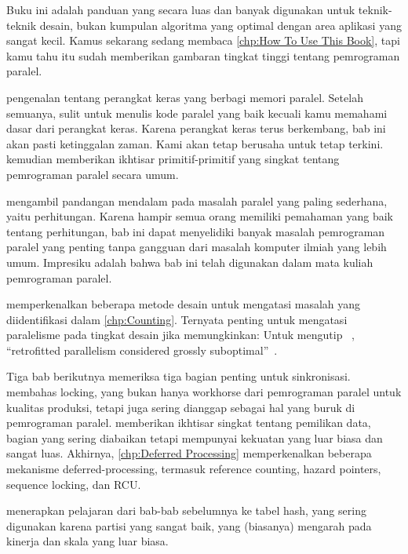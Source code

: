 Buku ini adalah panduan yang secara luas dan banyak digunakan untuk
teknik-teknik desain, bukan kumpulan algoritma yang optimal dengan
area aplikasi yang sangat kecil.
Kamus sekarang sedang membaca \cref{chp:How To Use This Book}, tapi
kamu tahu itu sudah memberikan gambaran tingkat tinggi tentang 
pemrograman paralel.

 pengenalan tentang perangkat keras
yang berbagi memori paralel.
Setelah semuanya, sulit untuk menulis kode paralel yang baik kecuali
kamu memahami dasar dari perangkat keras.
Karena perangkat keras terus berkembang, bab ini akan pasti
ketinggalan zaman.
Kami akan tetap berusaha untuk tetap terkini.
 kemudian memberikan ikhtisar primitif-primitif
yang singkat tentang pemrograman paralel secara umum.

 mengambil pandangan mendalam pada masalah
paralel yang paling sederhana, yaitu perhitungan.
Karena hampir semua orang memiliki pemahaman yang baik tentang
perhitungan, bab ini dapat menyelidiki banyak masalah
pemrograman paralel yang penting tanpa gangguan dari masalah
komputer ilmiah yang lebih umum.
Impresiku adalah bahwa bab ini telah digunakan dalam
mata kuliah pemrograman paralel.

memperkenalkan beberapa metode desain untuk mengatasi masalah
yang diidentifikasi dalam \cref{chp:Counting}.
Ternyata penting untuk mengatasi paralelisme pada tingkat
desain jika memungkinkan:
Untuk mengutip ~\cite{Dijkstra:1968:LEG:362929.362947},
``retrofitted parallelism considered grossly
suboptimal''~\cite{PaulEMcKenney2012HOTPARsuboptimal}.

Tiga bab berikutnya memeriksa tiga bagian penting untuk
sinkronisasi.
 membahas locking, yang bukan hanya
workhorse dari pemrograman paralel untuk kualitas produksi, tetapi juga
sering dianggap sebagai hal yang buruk di pemrograman paralel.
 memberikan ikhtisar singkat tentang
pemilikan data, bagian yang sering diabaikan tetapi
mempunyai kekuatan yang luar biasa dan sangat luas.
Akhirnya, \cref{chp:Deferred Processing} memperkenalkan beberapa
mekanisme deferred-processing, termasuk reference counting,
hazard pointers, sequence locking, dan RCU\@.

 menerapkan pelajaran dari bab-bab
sebelumnya ke tabel hash, yang sering digunakan karena
partisi yang sangat baik, yang (biasanya) mengarah pada kinerja
dan skala yang luar biasa.

